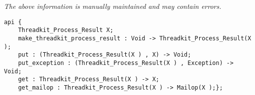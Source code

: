 \label{api:Process\_Result}

{\tiny \it The above information is manually maintained and may contain errors.}
\begin{verbatim}
api {
    Threadkit_Process_Result X;
    make_threadkit_process_result : Void -> Threadkit_Process_Result(X );
    put : (Threadkit_Process_Result(X ) , X) -> Void;
    put_exception : (Threadkit_Process_Result(X ) , Exception) -> Void;
    get : Threadkit_Process_Result(X ) -> X;
    get_mailop : Threadkit_Process_Result(X ) -> Mailop(X );};
\end{verbatim}
